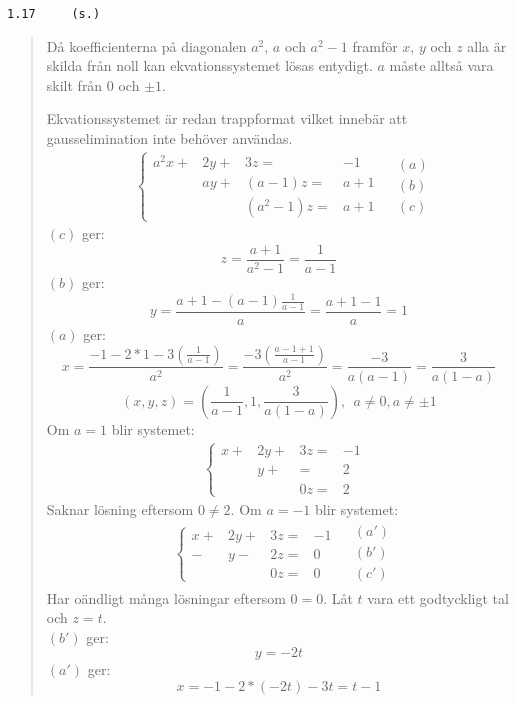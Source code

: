 \documentclass[a4paper]{article}
\newcommand{\tskcol}[1]{\textcolor{tskcol}{#1}}
\begin{document}
\texttt{\tskcol{1.17~~~~ (s.)}}
\begin{quotation}
	\noindent
	Då koefficienterna på diagonalen $a^2$, $a$ och $a^2-1$ framför $x$, $y$ och $z$ alla är skilda från noll kan ekvationssystemet lösas entydigt. $a$ måste alltså vara skilt från 0 och $\pm1$.
	
	Ekvationssystemet är redan trappformat vilket innebär att gausselimination inte behöver användas.
	\begin{align*}
	&\left\{\begin{array}{rrrr}
	a^2x+&2y+&      3z=&-1 \\
	     &ay+&  (a-1)z=&a+1 \\
	     &   &(a^2-1)z=&a+1
	\end{array} \right.
	&\begin{array}{l} 
	(a) \\ 
	(b) \\
	(c)
	\end{array}
	\end{align*}
	$(c)$ ger: 
	\[z=\frac{a+1}{a^2-1}=\frac{1}{a-1}\]
	$(b)$ ger:
	\[y=\frac{a+1-(a-1)\frac{1}{a-1}}{a}=\frac{a+1-1}{a}=1\]
	$(a)$ ger:
	\[x=\frac{-1-2*1-3(\frac{1}{a-1})}{a^2}=\frac{-3(\frac{a-1+1}{a-1})}{a^2}=\frac{-3}{a(a-1)}=\frac{3}{a(1-a)}\]
	\[(x,y,z)=\left(\frac{1}{a-1},1,\frac{3}{a(1-a)}\right),~~a\neq0,a\neq\pm1\]
	Om $a=1$ blir systemet:
	\begin{align*}
	&\left\{\begin{array}{rrrr}
	x+&2y+&3z=&-1 \\
	  & y+&  =&2 \\
	  &   &0z=&2
	\end{array} \right.
	\end{align*}
	Saknar lösning eftersom $0\neq2$.
	Om $a=-1$ blir systemet:
	\begin{align*}
	&\left\{\begin{array}{rrrr}
	x+&2y+&3z=&-1 \\
	 -& y-&2z=&0 \\
	  &   &0z=&0
	\end{array} \right.
	&\begin{array}{l} 
	(a') \\ 
	(b') \\
	(c')
	\end{array}
	\end{align*}
	Har oändligt många lösningar eftersom $0=0$. Låt $t$ vara ett godtyckligt tal och $z=t$.\\
	$(b')$ ger:
	\[y=-2t\]
	$(a')$ ger:
	\[x=-1-2*(-2t)-3t=t-1\]

\end{quotation}
\end{document}
